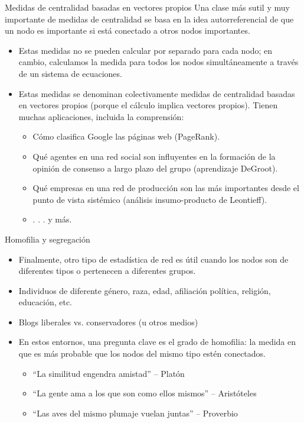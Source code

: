 \documentclass[11pt]{beamer}
\begin{document}
\begin{frame}{Medidas de centralidad basadas en vectores propios}
 \small Una clase más sutil y muy importante de medidas de centralidad se basa en la idea autorreferencial de que un nodo es importante si está conectado a otros nodos importantes.   
    \begin{itemize}
\small        \item Estas medidas no se pueden calcular por separado para cada nodo; en cambio, calculamos la medida para todos los nodos simultáneamente a través de un sistema de ecuaciones.
\item Estas medidas se denominan colectivamente medidas de centralidad basadas en vectores propios (porque el cálculo implica vectores propios). Tienen muchas aplicaciones, incluida la comprensión:
\begin{itemize}
\item Cómo clasifica Google las páginas web (PageRank).
\item Qué agentes en una red social son influyentes en la formación de la opinión de consenso a largo plazo del grupo (aprendizaje DeGroot).
\item Qué empresas en una red de producción son las más importantes desde el punto de vista sistémico (análisis insumo-producto de Leontieff).
\item . . . y más.
\end{itemize}
    \end{itemize}
\end{frame}


\begin{frame}{Homofilia y segregación}
\begin{itemize}
    \item Finalmente, otro tipo de estadística de red es útil cuando los nodos son de diferentes tipos o pertenecen a diferentes grupos.
\item Individuos de diferente género, raza, edad, afiliación política, religión, educación, etc.
\item  Blogs liberales vs. conservadores (u otros medios)
\item En estos entornos, una pregunta clave es el grado de homofilia: la medida en que es más probable que los nodos del mismo tipo estén conectados.
\begin{itemize}
\item  “La similitud engendra amistad” – Platón
\item  “La gente ama a los que son como ellos mismos” – Aristóteles
\item  “Las aves del mismo plumaje vuelan juntas” – Proverbio
\end{itemize}
\end{itemize}    
\end{frame}
\end{document}
